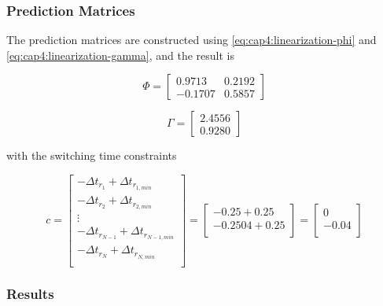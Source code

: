 \subsubsection{Prediction Matrices}

The prediction matrices are constructed using  \eqref{eq:cap4:linearization-phi} and \eqref{eq:cap4:linearization-gamma}, and the result is

\begin{equation}
    \Phi =
    \left[
    \begin{matrix}
        0.9713 & 0.2192 \\
        -0.1707 & 0.5857 
    \end{matrix}
    \right]
\end{equation}

\begin{equation}
    \Gamma =
    \left[
    \begin{matrix}
        2.4556 \\
        0.9280 
    \end{matrix}
    \right]
\end{equation}

with the switching time constraints

\begin{equation}
    c = 
    \left[
        \begin{matrix}
            -\Delta t_{r_1} + \Delta t_{r_{1, min}} \\
            -\Delta t_{r_2} + \Delta t_{r_{2, min}} \\
            \vdots \\
            -\Delta t_{r_{N-1}} + \Delta t_{r_{{N-1}, min}} \\
            -\Delta t_{r_N} + \Delta t_{r_{N, min}} \\
        \end{matrix}
    \right] = 
    \left[
        \begin{matrix}
            - 0.25 + 0.25 \\
            - 0.2504 + 0.25 \\
        \end{matrix}
    \right] =
    \left[
        \begin{matrix}
            0 \\
            - 0.04 \\
        \end{matrix}
    \right]
\end{equation}

\subsubsection{Results}

